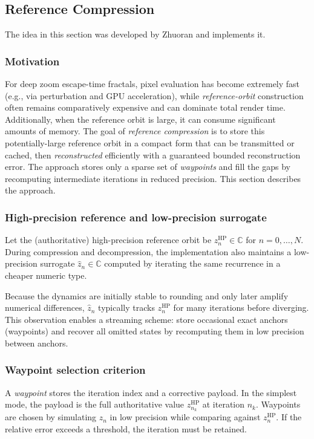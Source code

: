 \subsection{Reference Compression}
\label{sec:ref-compression-zhuoran}

The idea in this section was developed by Zhuoran
\cite{Zhuoran2023ReferenceCompression} and \FractalShark{} implements it.

\subsubsection{Motivation}
For deep zoom escape-time fractals, pixel evaluation has become extremely fast
(e.g., via perturbation and GPU acceleration), while \emph{reference-orbit}
construction often remains comparatively expensive and can dominate total render
time.  Additionally, when the reference orbit is large, it can consume
significant amounts of memory.  The goal of \emph{reference compression} is to
store this potentially-large reference orbit in a compact form that can be
transmitted or cached, then \emph{reconstructed} efficiently with a guaranteed
bounded reconstruction error. The approach stores only a sparse set of
\emph{waypoints} and fill the gaps by recomputing intermediate iterations in
reduced precision.  This section describes the approach.

\subsubsection{High-precision reference and low-precision surrogate}
Let the (authoritative) high-precision reference orbit be
\(
z_n^{\mathrm{HP}} \in \mathbb{C}
\)
for \(n=0,\dots,N\).
During compression and decompression, the implementation also maintains a low-precision surrogate
\(
\hat z_n \in \mathbb{C}
\)
computed by iterating the same recurrence in a cheaper numeric type.

Because the dynamics are initially stable to rounding and only later amplify
numerical differences, \(\hat z_n\) typically tracks \(z_n^{\mathrm{HP}}\) for
many iterations before diverging.  This observation enables a streaming scheme:
store occasional exact anchors (waypoints) and recover all omitted states by
recomputing them in low precision between anchors.

\subsubsection{Waypoint selection criterion}
A \emph{waypoint} stores the iteration index and a corrective payload.
In the simplest mode, the payload is the full authoritative value
\(z_{n_k}^{\mathrm{HP}}\) at iteration \(n_k\).
Waypoints are chosen by simulating \(\hat z_n\) in low precision while comparing
against \(z_n^{\mathrm{HP}}\).  If the relative error exceeds a threshold, the
iteration must be retained.

